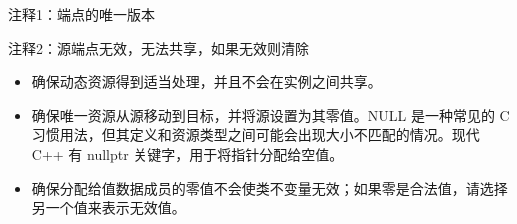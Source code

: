 {\footnotesize
注释1：端点的唯一版本

注释2：源端点无效，无法共享，如果无效则清除
}


\begin{itemize}
\item
确保动态资源得到适当处理，并且不会在实例之间共享。

\item
确保唯一资源从源移动到目标，并将源设置为其零值。NULL 是一种常见的 C 习惯用法，但其定义和资源类型之间可能会出现大小不匹配的情况。现代 C++ 有 nullptr 关键字，用于将指针分配给空值。

\item
确保分配给值数据成员的零值不会使类不变量无效；如果零是合法值，请选择另一个值来表示无效值。
\end{itemize}

















